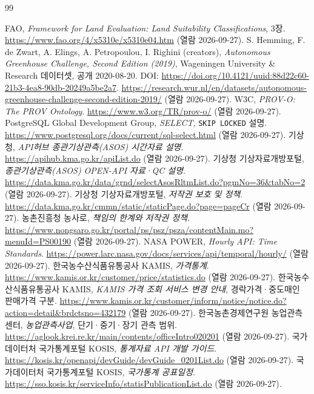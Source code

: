 \documentclass[11pt,a4paper]{article}
\begin{document}
\begin{thebibliography}{99}
{}
 FAO, \emph{Framework for Land Evaluation: Land Suitability Classifications}, 3장. \url{https://www.fao.org/4/x5310e/x5310e04.htm} (열람 2026-09-27).
 S. Hemming, F. de Zwart, A. Elings, A. Petropoulou, I. Righini (creators), \emph{Autonomous Greenhouse Challenge, Second Edition (2019)}, Wageningen University \& Research 데이터셋, 공개 2020-08-20. DOI: \url{https://doi.org/10.4121/uuid:88d22c60-21b3-4ea8-90db-20249a5be2a7}. \url{https://research.wur.nl/en/datasets/autonomous-greenhouse-challenge-second-edition-2019/} (열람 2026-09-27).
 W3C, \emph{PROV-O: The PROV Ontology}. \url{https://www.w3.org/TR/prov-o/} (열람 2026-09-27).
 PostgreSQL Global Development Group, \emph{SELECT}, \texttt{SKIP LOCKED} 설명. \url{https://www.postgresql.org/docs/current/sql-select.html} (열람 2026-09-27).
 기상청, \emph{API허브 종관기상관측(ASOS) 시간자료 설명}. \url{https://apihub.kma.go.kr/apiList.do} (열람 2026-09-27).
 기상청 기상자료개방포털, \emph{종관기상관측(ASOS) OPEN-API 자료·QC 설명}. \url{https://data.kma.go.kr/data/grnd/selectAsosRltmList.do?pgmNo=36&tabNo=2} (열람 2026-09-27).
 기상청 기상자료개방포털, \emph{저작권 보호 및 정책}. \url{https://data.kma.go.kr/cmmn/static/staticPage.do?page=pageCr} (열람 2026-09-27).
 농촌진흥청 농사로, \emph{책임의 한계와 저작권 정책}. \url{https://www.nongsaro.go.kr/portal/ps/psz/psza/contentMain.mo?menuId=PS00190} (열람 2026-09-27).
 NASA POWER, \emph{Hourly API: Time Standards}. \url{https://power.larc.nasa.gov/docs/services/api/temporal/hourly/} (열람 2026-09-27).
 한국농수산식품유통공사 KAMIS, \emph{가격통계}. \url{https://www.kamis.or.kr/customer/price/statistics.do} (열람 2026-09-27).
 한국농수산식품유통공사 KAMIS, \emph{KAMIS 가격 조회 서비스 변경 안내}, 경락가격·중도매인 판매가격 구분. \url{https://www.kamis.or.kr/customer/inform/notice/notice.do?action=detail&brdctsno=432179} (열람 2026-09-27).
 한국농촌경제연구원 농업관측센터, \emph{농업관측사업}, 단기·중기·장기 관측 범위. \url{https://aglook.krei.re.kr/main/contents/officeIntro020201} (열람 2026-09-27).
 국가데이터처 국가통계포털 KOSIS, \emph{통계자료 API 개발 가이드}. \url{https://kosis.kr/openapi/devGuide/devGuide_0201List.do} (열람 2026-09-27).
 국가데이터처 국가통계포털 KOSIS, \emph{국가통계 공표일정}. \url{https://sso.kosis.kr/serviceInfo/statisPublicationList.do} (열람 2026-09-27).

\end{thebibliography}
\end{document}
